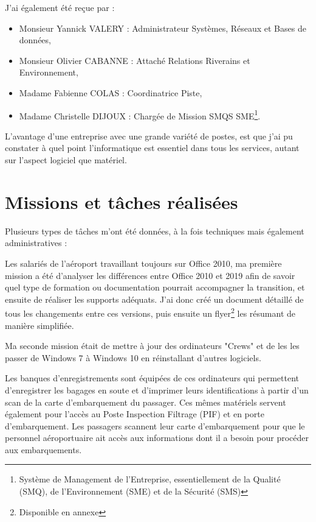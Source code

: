 J'ai également été reçue par :

\begin{itemize}
    \item Monsieur Yannick VALERY : Administrateur Systèmes, Réseaux et Bases de données,
    \item Monsieur Olivier CABANNE : Attaché Relations Riverains et Environnement,
    \item Madame Fabienne COLAS : Coordinatrice Piste,
    \item Madame Christelle DIJOUX : Chargée de Mission SMQS SME\footnote{Système de Management de l'Entreprise, essentiellement de la Qualité (SMQ), de l'Environnement (SME) et de la Sécurité (SMS)}.\newline
\end{itemize}


L'avantage d'une entreprise avec une grande variété de postes, est que j'ai pu constater à quel point l'informatique est essentiel dans tous les services, autant sur l'aspect logiciel que matériel.

\section{Missions et tâches réalisées}

Plusieurs types de tâches m’ont été données, à la fois techniques mais également administratives :\newline


Les salariés de l’aéroport travaillant toujours sur Office 2010, ma première mission a été d’analyser les différences entre Office 2010 et 2019 afin de savoir quel type de formation ou documentation pourrait accompagner la transition, et ensuite de réaliser les supports adéquats. J’ai donc créé un document détaillé de tous les changements entre ces versions, puis ensuite un flyer\footnote{Disponible en annexe} les résumant de manière simplifiée.\newline

Ma seconde mission était de mettre à jour des ordinateurs "Crews" et de les les passer de Windows 7 à Windows 10 en réinstallant d’autres logiciels.

Les banques d’enregistrements sont équipées de ces ordinateurs qui permettent d’enregistrer les bagages en soute et d’imprimer leurs identifications à partir d’un scan de la carte d’embarquement du passager. Ces mêmes matériels servent également pour l’accès au Poste Inspection Filtrage (PIF) et en porte d’embarquement. Les passagers scannent leur carte d’embarquement pour que le personnel aéroportuaire ait accès aux informations dont il a besoin pour procéder aux embarquements.

